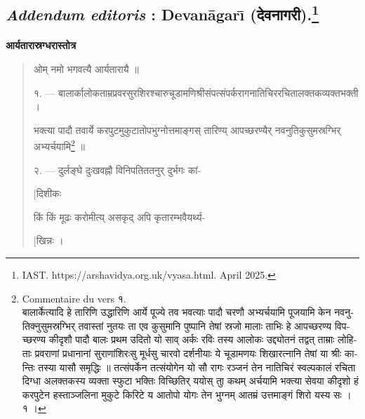 \documentclass[a4paper, 11pt, oneside, french]{article}
\begin{document}
\subsection[\emph{Addendum editoris} : Devan\={a}gar\={\i} \texthindi{(देवनागरी)}.]{\emph{Addendum editoris} : Devan\={a}gar\={\i} \texthindi{(देवनागरी)}.\footnote{IAST. https://arshavidya.org.uk/vyasa.html. April 2025.}}
\paragraph{}
\begin{center}
\texthindi{\textbf{आर्यतारास्रग्धरास्तोत्र}}
\end{center}

\bigskip
\begin{quotation}
\texthindi{ओम् नमो भगवत्यै आर्यतारायै ॥}

\bigskip

\texthindi{१}. --- \texthindi{बालार्कालोकताम्रप्रवरसुरशिरश्चारुचूडामणिश्रीसंपत्संपर्करागनातिचिररचितालक्तकव्यक्तभक्ती ।}

\texthindi{भक्त्या पादौ तवार्ये करपुटमुकुटातोपभुग्नोत्तमाङ्गस् तारिण्य् आपच्छरण्यैर् नवनुतिकुसुमस्रग्भिर् अभ्यर्चयामि\footnote{Commentaire du vers \texthindi{१}.\\\hspace*{5mm}\texthindi{बालार्केत्यादि हे तारिणि उद्धारिणि आर्ये पूज्ये तव भवत्याः पादौ चरणौ अभ्यर्चयामि पूजयामि केन नवनुतिक्नुसुमस्रग्भिर् तवास्तां नुतयः ता एव कुसुमानि पुष्पानि तेषां स्रजो मालाः ताभिः हे आपच्छरण्य विपच्छरण्य कीदृशौ पादौ बालः प्रथम उदितो यो साव् अर्कः रविः तस्य आलोकः उद्द्योतनं तद्वत् ताम्राः लोहिताः प्रवराणां प्रधानानां सुराणांशिरःसु मूर्धसु चारवो दर्शनीयाः ये चूडामणयः शिखारत्नानि तेषां या श्रीः कान्तिः तस्या यासौ समृद्धिः ॥ तत्संपर्केन तत्संयोगेन यो सौ रागः रञ्जनं तेन नातिचिरं स्वल्पकालं रचिता दिग्धा अलक्तकस्य व्यक्ता स्फुटा भक्तिः विच्छितिर् ययोस् ताु कथम् अर्चयामि भक्त्या सेवया कीदृशो हं करपुटेन हस्ताञ्जलिना मुकुटे किरिटे य आतोपो योगः तेन भुग्नम् आतम्रं उत्तमाङ्गं शिरो यस्य सः । १ ।}} ॥}

\bigskip

\texthindi{२}. --- \texthindi{दुर्लङ्घे दुःखवह्नौ विनिपतिततनुर् दुर्भगः कां-}

\hspace*{65mm}\texthindi{[दिशीकः}

\texthindi{किं किं मूढः करोमीत्य् असकृद् अपि कृतारम्भवैयर्थ्य-}

\hspace*{65mm}\texthindi{[खिन्नः ।}


\end{quotation}
\end{document}
